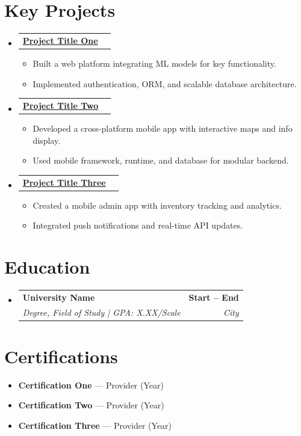 \documentclass[letterpaper,11pt]{article}
\makeatletter
\newcommand{\resumeItem}[1]{\item\small{{#1}}}
\newcommand{\resumeSubheading}[4]{\vspace{-2pt}\item
  \begin{tabular*}{1.0\textwidth}[t]{l@{\extracolsep{\fill}}r}
    \textbf{#1} & \textbf{\small #2} \\
    \textit{\small#3} & \textit{\small #4} \\
  \end{tabular*}\vspace{-7pt}}
\newcommand{\resumeProjectHeading}[2]{\item
  \begin{tabular*}{1.0\textwidth}{l@{\extracolsep{\fill}}r}
    \textbf{#1} & \textbf{\small #2}\\
  \end{tabular*}\vspace{-7pt}}
\newcommand{\resumeItemListStart}{\begin{itemize}[leftmargin=0.15in]}
\newcommand{\resumeItemListEnd}{\end{itemize}}
\newcommand{\resumeSubHeadingListStart}{\begin{itemize}[leftmargin=0.0in, label={}]}
\newcommand{\resumeSubHeadingListEnd}{\end{itemize}}
\makeatother
\begin{document}
\section{Key Projects}
\resumeSubHeadingListStart
  \resumeProjectHeading{\href{https://personalwebsite.dev/\#projects}{Project Title One}}{}
  \resumeItemListStart
    \resumeItem{Built a web platform integrating ML models for key functionality.}
    \resumeItem{Implemented authentication, ORM, and scalable database architecture.}
  \resumeItemListEnd

  \resumeProjectHeading{\href{https://personalwebsite.dev/\#projects}{Project Title Two}}{}
  \resumeItemListStart
    \resumeItem{Developed a cross-platform mobile app with interactive maps and info display.}
    \resumeItem{Used mobile framework, runtime, and database for modular backend.}
  \resumeItemListEnd

  \resumeProjectHeading{\href{https://personalwebsite.dev/\#projects}{Project Title Three}}{}
  \resumeItemListStart
    \resumeItem{Created a mobile admin app with inventory tracking and analytics.}
    \resumeItem{Integrated push notifications and real-time API updates.}
  \resumeItemListEnd
\resumeSubHeadingListEnd

\section{Education}
\resumeSubHeadingListStart
  \resumeSubheading
    {University Name}{Start -- End}
    {Degree, Field of Study | GPA: X.XX/Scale}{City}
\resumeSubHeadingListEnd

\section{Certifications}
\resumeItemListStart
  \resumeItem{\textbf{Certification One} — Provider (Year)}
  \resumeItem{\textbf{Certification Two} — Provider (Year)}
  \resumeItem{\textbf{Certification Three} — Provider (Year)}
\resumeItemListEnd
\end{document}
